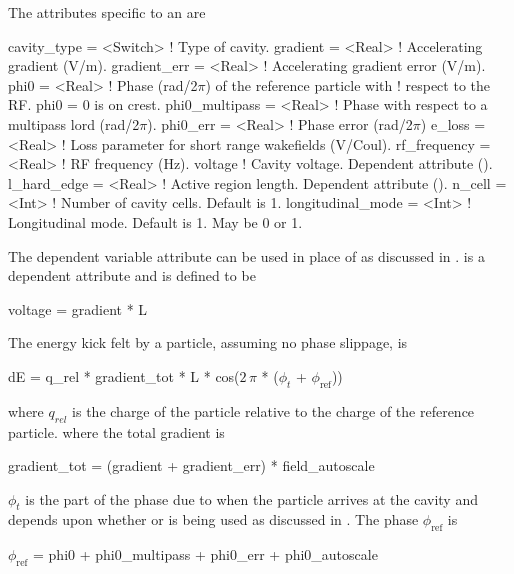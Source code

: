 The attributes specific to an  are 
\begin{example}
  cavity_type     = <Switch>  ! Type of cavity.
  gradient        = <Real>    ! Accelerating gradient (V/m).
  gradient_err    = <Real>    ! Accelerating gradient error (V/m).
  phi0            = <Real>    ! Phase (rad/2\(\pi\)) of the reference particle with 
                              !   respect to the RF. phi0 = 0 is on crest.
  phi0_multipass  = <Real>    ! Phase with respect to a multipass lord (rad/2\(\pi\)).
  phi0_err        = <Real>    ! Phase error (rad/2\(\pi\))
  e_loss          = <Real>    ! Loss parameter for short range wakefields (V/Coul).
  rf_frequency    = <Real>    ! RF frequency (Hz).
  voltage                     ! Cavity voltage. Dependent attribute ().
  l_hard_edge     = <Real>    ! Active region length. Dependent attribute ().
  n_cell          = <Int>     ! Number of cavity cells. Default is 1.
  longitudinal_mode = <Int>   ! Longitudinal mode. Default is 1. May be 0 or 1.
\end{example}

The dependent variable  attribute can be used in place of  as discussed in
.   is a dependent attribute and is defined to be
\begin{example}
  voltage = gradient * L
\end{example}

The energy kick felt by a particle, assuming no phase slippage, is 
\begin{example}
  dE = q_{rel} * gradient_tot * L * cos(\(2\,\pi\) * (\(\phi_t\) + \(\phi_\text{ref}\)))
\end{example}
where $q_{rel}$ is the charge of the particle relative to the charge of the reference particle.
where the total gradient is
\begin{example}
  gradient_tot = (gradient + gradient_err) * field_autoscale
\end{example}
$\phi_t$ is the part of the phase due to when the particle arrives at the cavity and depends upon
whether  or  is being used as discussed in
.  The phase $\phi_{\text{ref}}$ is
\begin{example}
  \(\phi_{\text{ref}}\) = phi0 + phi0_multipass + phi0_err + phi0_autoscale
  \label{lcav.phi}
\end{example}


